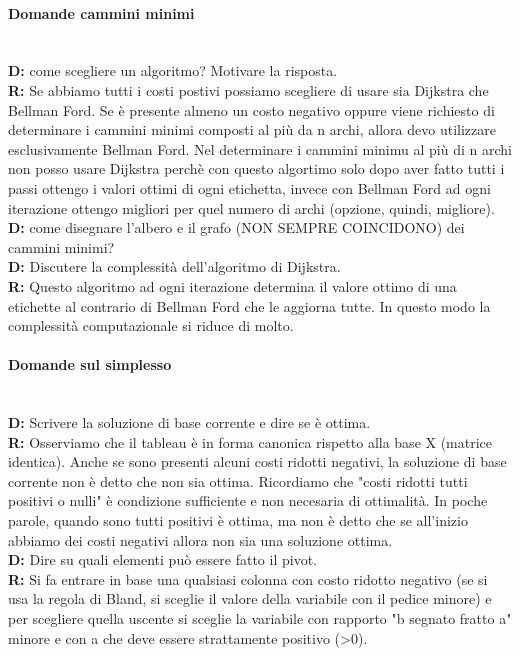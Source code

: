 \documentclass[10pt,                    %
               a4paper,                 %
               twoside,                 %
               openright,               %
               english,                 
               italian,                 
]{article}
\begin{document}
\paragraph{Domande cammini minimi} \mbox{} \\
\textbf{D:} come scegliere un algoritmo? Motivare la risposta. \\
\textbf{R:} Se abbiamo tutti i costi postivi possiamo scegliere di usare sia Dijkstra che Bellman Ford. Se è presente almeno un costo negativo oppure viene richiesto di determinare i cammini minimi composti al più da n archi, allora devo utilizzare esclusivamente Bellman Ford. Nel determinare i cammini minimu al più di n archi non posso usare Dijkstra perchè con questo algortimo solo dopo aver fatto tutti i passi ottengo i valori ottimi di ogni etichetta, invece con Bellman Ford ad ogni iterazione ottengo migliori per quel numero di archi (opzione, quindi, migliore). \\

\textbf{D:} come disegnare l'albero e il grafo (NON SEMPRE COINCIDONO) dei cammini minimi?
\\

\textbf{D:} Discutere la complessità dell'algoritmo di Dijkstra. \\
\textbf{R:} Questo algoritmo ad ogni iterazione determina il valore ottimo di una etichette al contrario di Bellman Ford che le aggiorna tutte. In questo modo la complessità computazionale si riduce di molto.  

\paragraph{Domande sul simplesso} \mbox{} \\
\textbf{D:} Scrivere la soluzione di base corrente e dire se è ottima. \\
\textbf{R:} Osserviamo che il tableau è in forma canonica rispetto alla base X (matrice identica). Anche se sono presenti alcuni costi ridotti negativi, la soluzione di base corrente non è detto che non sia ottima. Ricordiamo che "costi ridotti tutti positivi o nulli" è condizione sufficiente e non necesaria di ottimalità. In poche parole, quando sono tutti positivi è ottima, ma non è detto che se all'inizio abbiamo dei costi negativi allora non sia una soluzione ottima. \\

\textbf{D:} Dire su quali elementi può essere fatto il pivot. \\
\textbf{R:} Si fa entrare in base una qualsiasi colonna con costo ridotto negativo (se si usa la regola di Bland, si sceglie il valore della variabile con il pedice minore) e per scegliere quella uscente si sceglie la variabile con rapporto "b segnato fratto a" minore e con a che deve essere strattamente positivo (>0). \\
\end{document}

